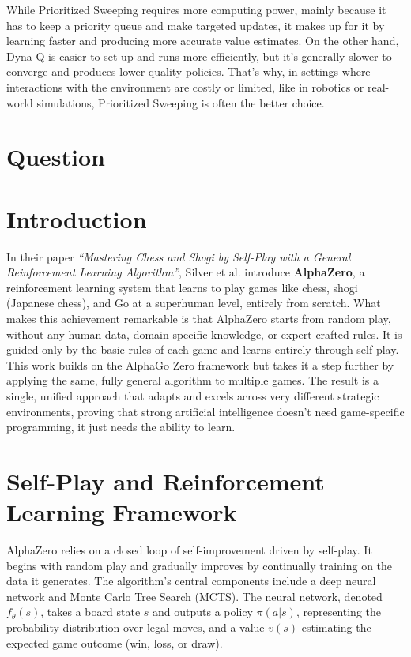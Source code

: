 \documentclass[12pt]{article}
\begin{document}
\noindent While Prioritized Sweeping requires more computing power, mainly because it has to keep a priority queue and make targeted updates, it makes up for it by learning faster and producing more accurate value estimates. On the other hand, Dyna-Q is easier to set up and runs more efficiently, but it's generally slower to converge and produces lower-quality policies. That’s why, in settings where interactions with the environment are costly or limited, like in robotics or real-world simulations, Prioritized Sweeping is often the better choice.

\pagebreak

\section{Question}

\section*{Introduction}

In their paper \textit{``Mastering Chess and Shogi by Self-Play with a General Reinforcement Learning Algorithm''}, Silver et al. introduce \textbf{AlphaZero}, a reinforcement learning system that learns to play games like chess, shogi (Japanese chess), and Go at a superhuman level, entirely from scratch. What makes this achievement remarkable is that AlphaZero starts from random play, without any human data, domain-specific knowledge, or expert-crafted rules. It is guided only by the basic rules of each game and learns entirely through self-play. \\

\noindent This work builds on the AlphaGo Zero framework but takes it a step further by applying the same, fully general algorithm to multiple games. The result is a single, unified approach that adapts and excels across very different strategic environments, proving that strong artificial intelligence doesn’t need game-specific programming, it just needs the ability to learn.


\section*{Self-Play and Reinforcement Learning Framework}

AlphaZero relies on a closed loop of self-improvement driven by self-play. It begins with random play and gradually improves by continually training on the data it generates. The algorithm's central components include a deep neural network and Monte Carlo Tree Search (MCTS). The neural network, denoted $f_\theta(s)$, takes a board state $s$ and outputs a policy $\pi(a|s)$, representing the probability distribution over legal moves, and a value $v(s)$ estimating the expected game outcome (win, loss, or draw). \\
\end{document}
